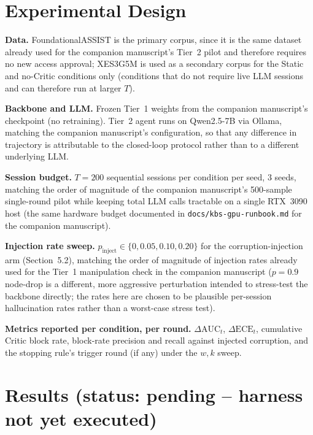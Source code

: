 \documentclass[review,12pt]{elsarticle}
\begin{document}
\section{Experimental Design}

\textbf{Data.} FoundationalASSIST is the primary corpus, since it is the
same dataset already used for the companion manuscript's Tier~2 pilot and
therefore requires no new access approval; XES3G5M is used as a secondary
corpus for the Static and no-Critic conditions only (conditions that do
not require live LLM sessions and can therefore run at larger $T$).

\textbf{Backbone and LLM.} Frozen Tier~1 weights from the companion
manuscript's checkpoint (no retraining). Tier~2 agent runs on Qwen2.5-7B
via Ollama, matching the companion manuscript's configuration, so that
any difference in trajectory is attributable to the closed-loop protocol
rather than to a different underlying LLM.

\textbf{Session budget.} $T = 200$ sequential sessions per condition per
seed, 3 seeds, matching the order of magnitude of the companion
manuscript's 500-sample single-round pilot while keeping total LLM calls
tractable on a single RTX~3090 host (the same hardware budget documented
in \texttt{docs/kbs-gpu-runbook.md} for the companion manuscript).

\textbf{Injection rate sweep.} $p_{\text{inject}} \in \{0, 0.05, 0.10,
0.20\}$ for the corruption-injection arm (Section~5.2), matching the
order of magnitude of injection rates already used for the Tier~1
manipulation check in the companion manuscript ($p=0.9$ node-drop is a
different, more aggressive perturbation intended to stress-test the
backbone directly; the rates here are chosen to be plausible per-session
hallucination rates rather than a worst-case stress test).

\textbf{Metrics reported per condition, per round.} $\Delta\text{AUC}_t$,
$\Delta\text{ECE}_t$, cumulative Critic block rate, block-rate precision
and recall against injected corruption, and the stopping rule's trigger
round (if any) under the $w,k$ sweep.

\section{Results (status: pending -- harness not yet executed)}
\end{document}
